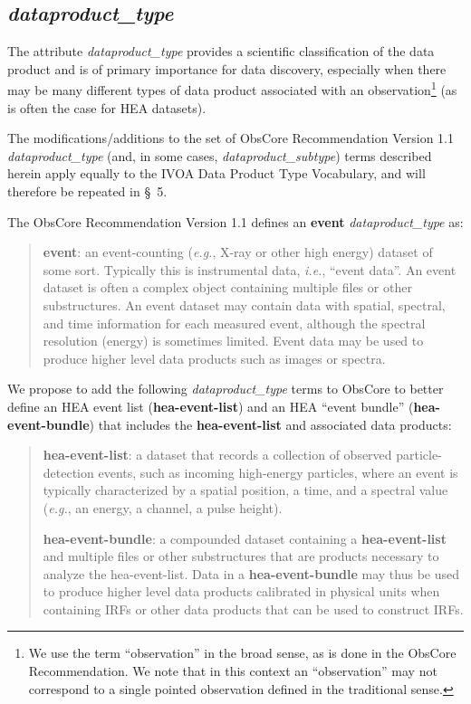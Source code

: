 \documentclass[11pt,a4paper]{ivoa}
\begin{document}
\subsection{{\em dataproduct\_type}}
\label{sec:dataproduct_type}

The attribute {\em dataproduct\_type\/} provides a scientific classification of the data product and is of primary importance for data discovery, especially when there may be many different types of data product associated with an observation\footnote{We use the term ``observation'' in the broad sense, as is done in the ObsCore Recommendation. We note that in this context an ``observation'' may not correspond to a single pointed observation defined in the traditional sense.} (as is often the case for \gls{HEA} datasets).

The modifications/additions to the set of ObsCore Recommendation Version 1.1 \citep{2017ivoa.spec.0509L} {\em dataproduct\_type\/} (and, in some cases, {\em dataproduct\_subtype\/}) terms described herein apply equally to the IVOA Data Product Type Vocabulary, and will therefore be repeated in \S~5.

The ObsCore Recommendation Version 1.1 \citep{2017ivoa.spec.0509L} defines an {\bf event} {\em dataproduct\_type\/} as:

\begin{quote}
{\bf event}: an event-counting ({\em e.g.\/}, X-ray or other high energy) dataset of some sort. Typically this is instrumental data, {\em i.e.\/}, ``event data''.  An event dataset is often a complex object containing multiple files or other substructures. An event dataset may contain data with spatial, spectral, and time information for each measured event, although the spectral resolution (energy) is sometimes limited. Event data may be used to produce higher level data products such as images or spectra.
\end{quote}

We propose to add the following {\em dataproduct\_type\/} terms to ObsCore to better define an \gls{HEA} event list ({\bf hea-event-list}) and an \gls{HEA} ``event bundle'' ({\bf hea-event-bundle}) that includes the {\bf hea-event-list} and associated data products:
\begin{quote}
{\bf hea-event-list}: a dataset that records a collection of observed particle-detection events, such as incoming high-energy particles, where an event is typically characterized by a spatial position, a time, and a spectral value ({\em e.g.\/}, an energy, a channel, a pulse height).

{\bf hea-event-bundle}: a compounded dataset containing a {\bf hea-event-list} and multiple files or other substructures that are products necessary to analyze the hea-event-list. Data in a {\bf hea-event-bundle} may thus be used to produce higher level data products calibrated in physical units when containing \glspl{IRF} or other data products that can be used to construct \glspl{IRF}.
\end{quote}
\end{document}
